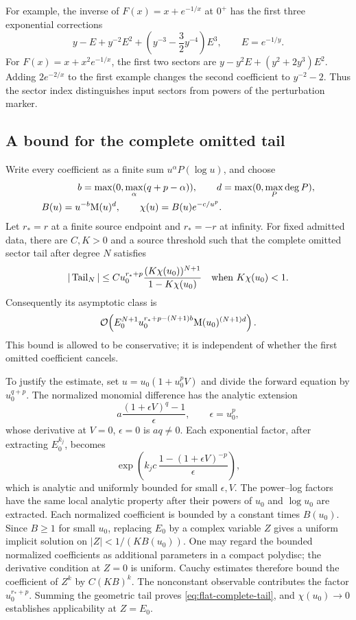 For example, the inverse of $F(x)=x+e^{-1/x}$ at $0^+$ has the
first three exponential corrections
\begin{equation}
 y-E+y^{-2}E^2+
 \left(y^{-3}-\frac32 y^{-4}\right)E^3,
 \qquad E=e^{-1/y}.
 \label{eq:flat-primary-inverse}
\end{equation}
For $F(x)=x+x^2e^{-1/x}$, the first two sectors are
$y-y^2E+(y^2+2y^3)E^2$. Adding $2e^{-2/x}$ to the first example changes
the second coefficient to $y^{-2}-2$. Thus the sector index distinguishes
input sectors from powers of the perturbation marker.

\subsection{A bound for the complete omitted tail}

Write every coefficient as a finite sum $u^\alpha P(\log u)$, and choose
\[
\begin{aligned}
 b=\max(0,\max_{\alpha}(q+p-\alpha)),\qquad
 d&=\max(0,\max_P\deg P),\\
 B(u)=u^{-b}\mathrm M(u)^d,\qquad \chi(u)=B(u)e^{-c/u^p}.
\end{aligned}
\]
Let $r_*=r$ at a finite source endpoint and $r_*=-r$ at infinity.
For fixed admitted data, there are $C,K>0$ and a source threshold such that
the complete omitted sector tail after degree $N$ satisfies
\begin{equation}
 |\operatorname{Tail}_N|
 \le C u_0^{r_*+p}
 \frac{(K\chi(u_0))^{N+1}}{1-K\chi(u_0)}
 \quad\hbox{when }K\chi(u_0)<1.
 \label{eq:flat-complete-tail}
\end{equation}
Consequently its asymptotic class is
\[
 \mathcal O\!\left(E_0^{N+1}
 u_0^{r_*+p-(N+1)b}\mathrm M(u_0)^{(N+1)d}\right).
\]
This bound is allowed to be conservative; it is independent of whether the
first omitted coefficient cancels.

To justify the estimate, set $u=u_0(1+u_0^p V)$ and divide the forward
equation by $u_0^{q+p}$. The normalized monomial difference has the analytic
extension
\[
 a\frac{(1+\epsilon V)^q-1}{\epsilon},
 \qquad \epsilon=u_0^p,
\]
whose derivative at $V=0$, $\epsilon=0$ is $a q\ne0$. Each exponential
factor, after extracting $E_0^{k_j}$, becomes
\[
 \exp\!\left(k_jc\,
 \frac{1-(1+\epsilon V)^{-p}}{\epsilon}\right),
\]
which is analytic and uniformly bounded for small $\epsilon,V$. The
power--log factors have the same local analytic property after their
powers of $u_0$ and $\log u_0$ are extracted. Each normalized coefficient
is bounded by a constant times $B(u_0)$. Since $B\ge1$ for small $u_0$,
replacing $E_0$ by a complex variable $Z$ gives a uniform implicit solution
on $|Z|<1/(K B(u_0))$. One may regard the bounded normalized coefficients
as additional parameters in a compact polydisc; the derivative condition
at $Z=0$ is uniform. Cauchy estimates therefore bound the coefficient of
$Z^k$ by $C(KB)^k$. The nonconstant observable contributes the factor
$u_0^{r_*+p}$. Summing the geometric tail proves
\eqref{eq:flat-complete-tail}, and $\chi(u_0)\to0$ establishes applicability
at $Z=E_0$.

